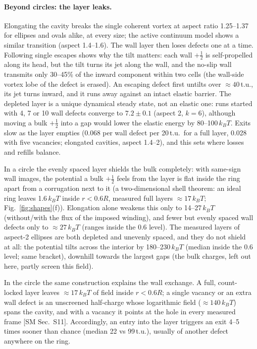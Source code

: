 \documentclass[aps,prl,twocolumn,superscriptaddress,amsmath,amssymb,reprint]{revtex4-2}
\newcommand{\half}{\tfrac12}
\newcommand{\kT}{k_BT}
\begin{document}
\paragraph*{Beyond circles: the layer leaks.} Elongating the cavity breaks the single coherent vortex at aspect ratio 1.25--1.37 for ellipses and ovals alike,
at every size; the active continuum model shows a similar transition (aspect 1.4--1.6). The wall layer then loses defects one at a time. Following single escapes shows why the
tilt matters: each wall $+\half$ is self-propelled along its head, but the tilt turns its jet along the wall, and the no-slip wall transmits only 30--45\%
of the inward component within two cells (the wall-side vortex lobe of the defect is erased). An escaping defect first untilts over $\approx40$\,t.u., its jet
turns inward, and it runs away against an intact elastic barrier. The depleted layer is a unique dynamical steady state, not an elastic one: runs started with 4, 7
or 10 wall defects converge to $7.2\pm0.1$ (aspect 2, $k=6$), although moving a bulk $+\half$ into a gap would lower the elastic energy by 80--100\,$\kT$. Exits slow as the
layer empties (0.068 per wall defect per 20\,t.u.\ for a full layer, 0.028 with five vacancies; elongated cavities, aspect 1.4--2), and this sets where losses and refills balance.

In a circle the evenly spaced layer shields the bulk completely: with same-sign wall images, the potential a bulk $+\half$ feels from the layer is flat
inside the ring apart from a corrugation next to it (a two-dimensional shell theorem: an ideal ring leaves 1.6\,$\kT$ inside $r<0.6R$, measured full layers $\approx17\,\kT$; Fig.~\ref{fig:shapes}(f)).
Elongation alone weakens this only to 14--27\,$\kT$ (without/with the flux of the imposed winding), and fewer but evenly spaced wall defects only to $\approx27\,\kT$ (ranges inside the 0.6 level). The measured layers of aspect-2
ellipses are both depleted and unevenly spaced, and they do not shield at all: the potential tilts across the interior by 180--230\,$\kT$ (median inside the 0.6 level; same bracket), downhill
towards the largest gaps (the bulk charges, left out here, partly screen this field).

In the circle the same construction explains the wall exchange. A full, count-locked layer leaves $\approx17\,\kT$ of field inside $r<0.6R$; a single vacancy or an
extra wall defect is an unscreened half-charge whose logarithmic field ($\approx140\,\kT$) spans the cavity, and with a vacancy it points at the hole in every
measured frame [SM Sec.~S11]. Accordingly, an entry into the layer triggers an exit 4--5 times sooner than chance (median 22 vs 99\,t.u.), usually of
another defect anywhere on the ring.
\end{document}

